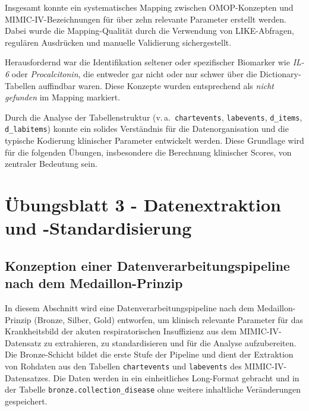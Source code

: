 \documentclass[12pt]{article}
\begin{document}
Insgesamt konnte ein systematisches Mapping zwischen OMOP-Konzepten und MIMIC-IV-Bezeichnungen für über zehn relevante Parameter erstellt werden. Dabei wurde die Mapping-Qualität durch die Verwendung von LIKE-Abfragen, regulären Ausdrücken und manuelle Validierung sichergestellt.

Herausfordernd war die Identifikation seltener oder spezifischer Biomarker wie \textit{IL-6} oder \textit{Procalcitonin}, die entweder gar nicht oder nur schwer über die Dictionary-Tabellen auffindbar waren. Diese Konzepte wurden entsprechend als \textit{nicht gefunden} im Mapping markiert.

Durch die Analyse der Tabellenstruktur (v.\,a.\ \texttt{chartevents}, \texttt{labevents}, \texttt{d\_items}, \texttt{d\_labitems}) konnte ein solides Verständnis für die Datenorganisation und die typische Kodierung klinischer Parameter entwickelt werden. Diese Grundlage wird für die folgenden Übungen, insbesondere die Berechnung klinischer Scores, von zentraler Bedeutung sein.



\section{Übungsblatt 3 - Datenextraktion und -Standardisierung}

\subsection{Konzeption einer Datenverarbeitungspipeline nach dem Medaillon-Prinzip}

In diesem Abschnitt wird eine Datenverarbeitungspipeline nach dem Medaillon-Prinzip (Bronze, Silber, Gold) entworfen, um klinisch relevante Parameter für das Krankheitsbild der akuten respiratorischen Insuffizienz aus dem MIMIC-IV-Datensatz zu extrahieren, zu standardisieren und für die Analyse aufzubereiten.\\

\noindent 
Die Bronze-Schicht bildet die erste Stufe der Pipeline und dient der Extraktion von Rohdaten aus den Tabellen \texttt{chartevents} und \texttt{labevents} des MIMIC-IV-Datensatzes. Die Daten werden in ein einheitliches Long-Format gebracht und in der Tabelle \texttt{bronze.collection\_disease} ohne weitere inhaltliche Veränderungen gespeichert.\\
\end{document}
